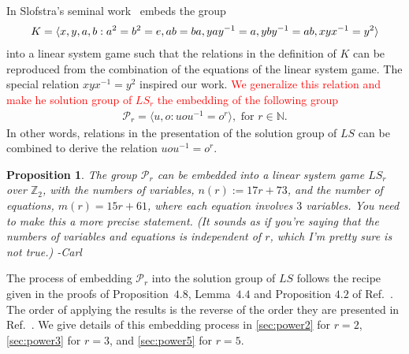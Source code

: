 \documentclass[11pt,letterpaper]{article}
\DeclarePairedDelimiter{\ip}{\langle}{\rangle}
\newcommand{\N}{\mathbb{N}}
\newcommand{\Z}{\mathbb{Z}}
\newcommand{\1}{\mathbb{1}}
\newcommand{\Pg}{\mathcal{P}}
\newcommand{\LS}{LS}
\newcommand{\nr}{n(r)}
\newcommand{\mr}{m(r)}
\def\carl#1{{\color{blue} #1 -Carl}}
\newcommand{\hf}[1]{\textcolor{red}{#1}}
\newtheorem{proposition}[theorem]{Proposition}
\theoremstyle{definition}
\begin{document}
In Slofstra's seminal work~\cite{slofstra2017} embeds the group
\begin{align}
	K = \ip{ x,y,a,b:a^2=b^2=e, ab=ba, yay^{-1} = a, yby^{-1} = ab, xyx^{-1}=y^2}
\end{align}
into a linear system game such that the relations in the definition of $K$ can be reproduced from the
combination of the equations of the linear system game. The special relation $xyx^{-1} = y^2$ inspired 
our work.
\hf{We generalize this relation and make he solution group of $\LS_r$ the embedding of the 
following group}
\begin{align}
	\Pg_r= \langle u, o : uou^{-1} = o^r \rangle, \text{ for } r \in \N.
\end{align}
In other words, relations in the presentation of the solution group of $\LS$ can be combined to derive the
relation $uou^{-1} = o^r$.  
\begin{proposition}
	\label{prop:embed}
	The group $\Pg_r$ can be embedded into a linear system game $\LS_r$ over $\Z_2$,
	with the numbers of variables, $\nr := 17r + 73$, 
	and the number of equations, $\mr =15r + 61$, where each equation involves $3$ variables.
	\carl{You need to make this a more precise statement.  (It sounds as if you're saying 
	that the numbers of variables and equations is independent of $r$, which I'm pretty sure is not true.)}
\end{proposition}
The process of embedding $\Pg_r$ into the solution group of $\LS$ follows the recipe given in the proofs of
Proposition~$4.8$, Lemma~$4.4$ and Proposition $4.2$ of Ref.~\cite{slofstra2017}.
The order of applying the results is the reverse of the order they are presented in Ref.~\cite{slofstra2017}.
We give details of this embedding process in \cref{sec:power2} for $r = 2$, \cref{sec:power3} for $r = 3$, 
and \cref{sec:power5} for $r = 5$. 
\end{document}
